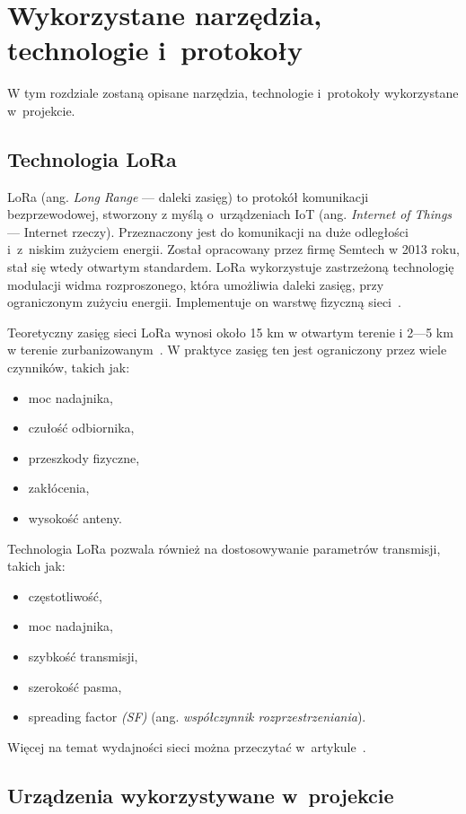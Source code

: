 
\chapter{Wykorzystane narzędzia, technologie i~protokoły}
W tym rozdziale zostaną opisane narzędzia, technologie i~protokoły wykorzystane w~projekcie.
\section{Technologia LoRa}
LoRa (ang. \emph{Long Range} — daleki zasięg) to protokół komunikacji bezprzewodowej, stworzony z myślą o~urządzeniach IoT (ang. \emph{Internet of Things} — Internet rzeczy).
Przeznaczony jest do komunikacji na duże odległości i~z~niskim zużyciem energii.
Został opracowany przez firmę Semtech w 2013 roku, stał się wtedy otwartym standardem.
LoRa wykorzystuje zastrzeżoną technologię modulacji widma rozproszonego, która umożliwia daleki zasięg, przy ograniczonym zużyciu energii.
Implementuje on warstwę fizyczną sieci~\cite{lora:about}.

Teoretyczny zasięg sieci LoRa wynosi około 15 km w otwartym terenie i 2—5 km w terenie zurbanizowanym~\cite{bib:lora-performance}.
W praktyce zasięg ten jest ograniczony przez wiele czynników, takich jak:
\begin{itemize}
    \item moc nadajnika,
    \item czułość odbiornika,
    \item przeszkody fizyczne,
    \item zakłócenia,
    \item wysokość anteny.
\end{itemize}

Technologia LoRa pozwala również na dostosowywanie parametrów transmisji, takich jak:
\begin{itemize}
    \item częstotliwość,
    \item moc nadajnika,
    \item szybkość transmisji,
    \item szerokość pasma,
    \item spreading factor \emph{(SF)} (ang. \emph{współczynnik rozprzestrzeniania}).
\end{itemize}
Więcej na temat wydajności sieci można przeczytać w~artykule~\cite{bib:lora-performance}.

\section{Urządzenia wykorzystywane w~projekcie}

